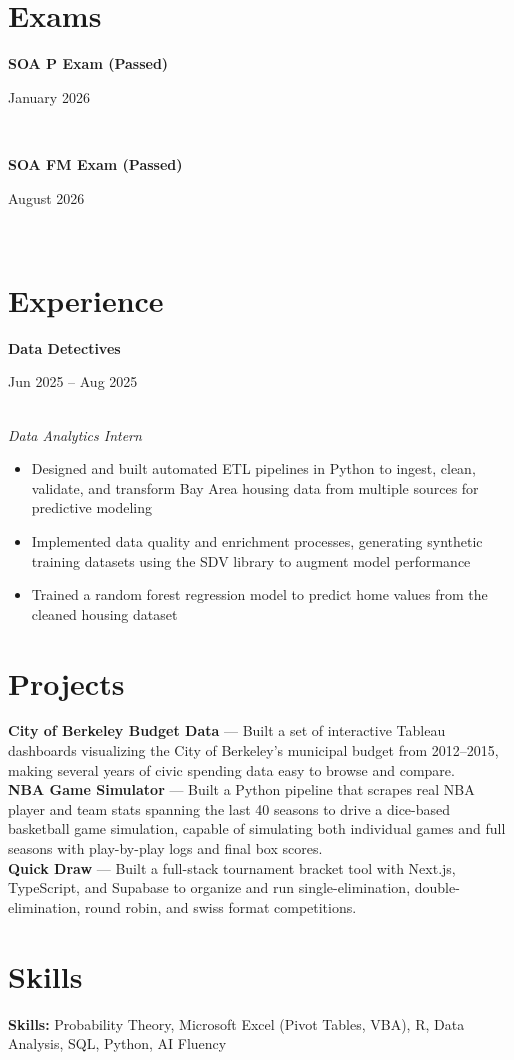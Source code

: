 \documentclass[11pt,letterpaper]{article}
\newcommand{\entry}[3]{%
  \noindent\begin{minipage}[t]{0.72\textwidth}\raggedright\textbf{#1}\end{minipage}%
  \hfill\begin{minipage}[t]{0.26\textwidth}\raggedleft\small\color{gray}#2\end{minipage}\\
  \textit{#3}\par\vspace{2pt}
}
\newcommand{\examentry}[2]{%
  \noindent\begin{minipage}[t]{0.72\textwidth}\raggedright\textbf{#1}\end{minipage}%
  \hfill\begin{minipage}[t]{0.26\textwidth}\raggedleft\small\color{gray}#2\end{minipage}\\[1pt]
}
\begin{document}


\vspace{4pt}



\section*{Exams}
\examentry{SOA P Exam (Passed)}{January 2026}
\examentry{SOA FM Exam (Passed)}{August 2026}

\section*{Experience}



\entry{Data Detectives}{Jun 2025 -- Aug 2025}{Data Analytics Intern}
\begin{itemize}
  \item Designed and built automated ETL pipelines in Python to ingest, clean, validate, and transform Bay Area housing data from multiple sources for predictive modeling
  \item Implemented data quality and enrichment processes, generating synthetic training datasets using the SDV library to augment model performance
  \item Trained a random forest regression model to predict home values from the cleaned housing dataset
\end{itemize}



\section*{Projects}
\textbf{City of Berkeley Budget Data} --- Built a set of interactive Tableau dashboards visualizing the City of Berkeley's municipal budget from 2012--2015, making several years of civic spending data easy to browse and compare.\\[4pt]
\textbf{NBA Game Simulator} --- Built a Python pipeline that scrapes real NBA player and team stats spanning the last 40 seasons to drive a dice-based basketball game simulation, capable of simulating both individual games and full seasons with play-by-play logs and final box scores.\\[4pt]
\textbf{Quick Draw} --- Built a full-stack tournament bracket tool with Next.js, TypeScript, and Supabase to organize and run single-elimination, double-elimination, round robin, and swiss format competitions.

\section*{Skills}
\textbf{Skills:} Probability Theory, Microsoft Excel (Pivot Tables, VBA), R, Data Analysis, SQL, Python, AI Fluency
\end{document}
